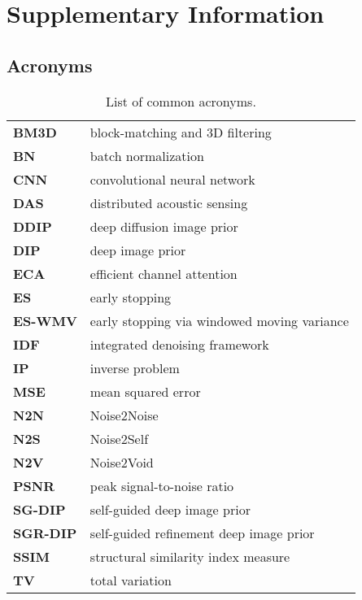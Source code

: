 \chapter{Supplementary Information}

\section{Acronyms}

\begin{table}[h!]
    \centering
    \begin{tabular}{ l l }
        \toprule
        \textbf{BM3D} & block-matching and 3D filtering \\
        \textbf{BN} & batch normalization \\
        \textbf{CNN} & convolutional neural network \\
        \textbf{DAS} & distributed acoustic sensing \\
        \textbf{DDIP} & deep diffusion image prior \\
        \textbf{DIP} & deep image prior \\
        \textbf{ECA} & efficient channel attention \\
        \textbf{ES} & early stopping \\
        \textbf{ES-WMV} & early stopping via windowed moving variance \\
        \textbf{IDF} & integrated denoising framework \\
        \textbf{IP} & inverse problem \\
        \textbf{MSE} & mean squared error \\
        \textbf{N2N} & Noise2Noise \\
        \textbf{N2S} & Noise2Self \\
        \textbf{N2V} & Noise2Void \\
        \textbf{PSNR} & peak signal-to-noise ratio \\
        \textbf{SG-DIP} & self-guided deep image prior \\
        \textbf{SGR-DIP} & self-guided refinement deep image prior \\
        \textbf{SSIM} & structural similarity index measure \\
        \textbf{TV} & total variation \\
        \bottomrule
    \end{tabular}
    \caption{List of common acronyms.}
\end{table}

